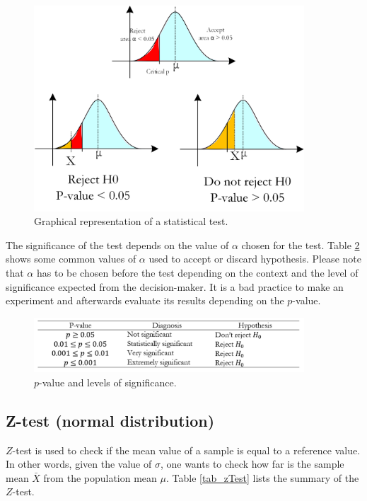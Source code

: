 \begin{figure}[hbt!]
\centering
\includegraphics[width=0.9\textwidth]{SectionLetsMath/elemStat_figures/fig_StatTest.png}
\captionsetup{type=figure}
\caption{Graphical representation of a statistical test.}
\label{fig_StatTest}
\end{figure}

The significance of the test depends on the value of $\alpha$ chosen for the test. Table \ref{tab_statTest} shows some common values of $\alpha$ used to accept or discard hypothesis. Please note that $\alpha$ has to be chosen before the test depending on the context and the level of significance expected from the decision-maker. It is a bad practice to make an experiment and afterwards evaluate its results depending on the $p$-value.

\begin{figure}[hbt!]
\centering
\includegraphics[width=0.9\textwidth]{SectionLetsMath/elemStat_figures/tab_statTest.png}
\captionsetup{type=table}
\caption{$p$-value and levels of significance.}
\label{tab_statTest}
\end{figure}

\subsection{Z-test (normal distribution)}
$Z$-test is used to check if the mean value of a sample is equal to a reference value. In other words, given the value of $\sigma$, one wants to check how far is the sample mean $\bar{X}$ from the population mean $\mu$. Table \ref{tab_zTest} lists the summary of the $Z$-test.


